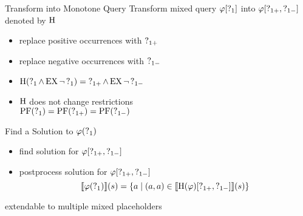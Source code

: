 \begin{frame}{Transform into Monotone Query}
  Transform mixed query $\varphi[\operatorname{?}_1]$ into $\varphi[\operatorname{?}_{1+},\operatorname{?}_{1-}]$ denoted by $\operatorname{H}$
  \begin{itemize}
    \item replace positive occurrences with $\operatorname{?}_{1+}$
    \item replace negative occurrences with $\operatorname{?}_{1-}$
    \item $\operatorname{H}(\operatorname{?}_1 \land \operatorname{EX} \lnot \operatorname{?}_1) = \operatorname{?}_{1+} \land \operatorname{EX} \lnot \operatorname{?}_{1-}$
    \item $\operatorname{H}$ does not change restrictions \\ 
          $\operatorname{PF}(\operatorname{?}_{1}) = \operatorname{PF}(\operatorname{?}_{1+}) = \operatorname{PF}(\operatorname{?}_{1-})$
  \end{itemize}
\end{frame}

\begin{frame}{Find a Solution to $\varphi(\operatorname{?}_1)$}
  \begin{itemize}
    \item find solution for $\varphi[\operatorname{?}_{1+},\operatorname{?}_{1-}]$
    \item postprocess solution for $\varphi[\operatorname{?}_{1+},\operatorname{?}_{1-}]$
      \[
        \llbracket \varphi(\operatorname{?}_1) \rrbracket (s) = \{ a \mid (a,a) \in 
          \llbracket \operatorname{H} (\varphi)[\operatorname{?}_{1+},\operatorname{?}_{1-}] \rrbracket (s) \}
      \]
  \end{itemize}
  
  extendable to multiple mixed placeholders
\end{frame}
